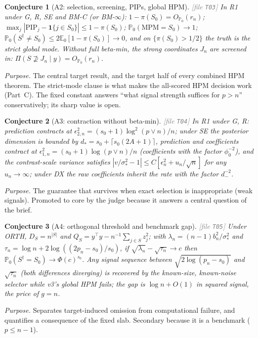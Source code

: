 \documentclass[11pt,a4paper]{article}
\theoremstyle{plain}
\newtheorem{conjecture}{Conjecture}[section]
\theoremstyle{definition}
\theoremstyle{remark}
\newcommand{\Pz}{\mathbb{P}_0}
\newcommand{\Ez}{\mathbb{E}_0}
\newcommand{\Sz}{S_0}
\newcommand{\Sdag}{S^{\dagger}}
\newcommand{\sz}{s_0}
\newcommand{\PIP}{\mathrm{PIP}}
\newcommand{\MPM}{\mathrm{MPM}}
\newcommand{\ind}[1]{\mathbf{1}\{#1\}}
\newcommand{\rn}{r_n}
\newcommand{\thfile}[1]{\textcolor{gray}{\footnotesize[file \texttt{#1}]}}
\begin{document}
\begin{conjecture}[A2: selection, screening, PIPs, global HPM]\thfile{T03}
In R1 under G, R, SE and BM-C (or BM-$\infty$): $1-\pi(\Sz)=O_{\Pz}(\rn)$; $\max_j|\PIP_j-\ind{j\in\Sz}|\le1-\pi(\Sz)$; $\Pz(\MPM=\Sz)\to1$; $\Pz(\Sdag\ne\Sz)\le2\Ez[1-\pi(\Sz)]\to0$, and on $\{\pi(\Sz)>1/2\}$ the truth is the strict global mode. Without full beta-min, the strong coordinates $J_n$ are screened in: $\Pi(S\not\supseteq J_n\mid y)=O_{\Pz}(\rn)$.
\end{conjecture}
\emph{Purpose.} The central target result, and the target half of every combined HPM theorem. The strict-mode clause is what makes the all-scored HPM decision work (Part~C). The fixed constant answers ``what signal strength suffices for $p>n$'' conservatively; its sharp value is open.

\begin{conjecture}[A3: contraction without beta-min]\thfile{T04}
In R1 under G, R: prediction contracts at $\epsilon_{2,n}^2=(\sz+1)\log^2(p\vee n)/n$; under SE the posterior dimension is bounded by $d_*=\sz+\lceil\sz(2A+1)\rceil$, prediction and coefficients contract at $\epsilon_{1,n}^2=(\sz+1)\log(p\vee n)/n$ (coefficients with the factor $\phi_0^{-2}$), and the contrast-scale variance satisfies $|v/\sigma_*^2-1|\le C[\epsilon_n^2+u_n/\sqrt n]$ for any $u_n\to\infty$; under DX the raw coefficients inherit the rate with the factor $d_-^{-2}$.
\end{conjecture}
\emph{Purpose.} The guarantee that survives when exact selection is inappropriate (weak signals). Promoted to core by the judge because it answers a central question of the brief.

\begin{conjecture}[A4: orthogonal threshold and benchmark gap]\label{c:A4}\thfile{T05}
Under ORTH, $D_S=n^{|S|}$ and $Q_S=y^\top y-n^{-1}\sum_{j\in S}z_j^2$; with $\lambda_n=(n-1)b_n^2/\sigma_*^2$ and $\tau_n=\log n+2\log((2p_n-\sz)/\sz)$, if $\sqrt{\lambda_n}-\sqrt{\tau_n}\to c$ then $\Pz(\Sdag=\Sz)\to\Phi(c)^{\sz}$. Any signal sequence between $\sqrt{2\log(p_n-\sz)}$ and $\sqrt{\tau_n}$ (both differences diverging) is recovered by the known-size, known-noise selector while v3's global HPM fails; the gap is $\log n+O(1)$ in squared signal, the price of $g=n$.
\end{conjecture}
\emph{Purpose.} Separates target-induced omission from computational failure, and quantifies a consequence of the fixed slab. Secondary because it is a benchmark ($p\le n-1$).
\end{document}
